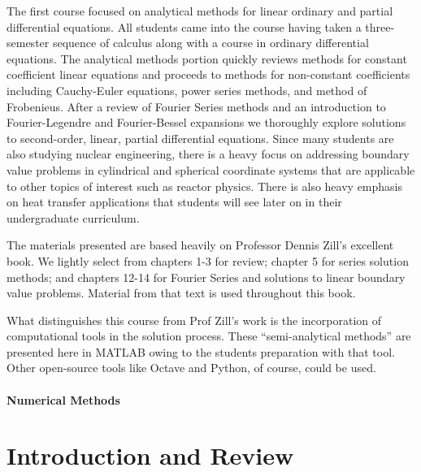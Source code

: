 \documentclass{tufte-book}
\theoremstyle{break}
\begin{document}
The first course focused on analytical methods for linear ordinary and partial differential equations.  All students came into the course having taken a three-semester sequence of calculus along with a course in ordinary differential equations.  The analytical methods portion quickly reviews methods for constant coefficient linear equations and proceeds to methods for non-constant coefficients including Cauchy-Euler equations, power series methods, and method of Frobenieus.  After a review of Fourier Series methods and an introduction to Fourier-Legendre and Fourier-Bessel expansions we thoroughly explore solutions to second-order, linear, partial differential equations.  Since many students are also studying nuclear engineering, there is a heavy focus on addressing boundary value problems in cylindrical and spherical coordinate systems that are applicable to other topics of interest such as reactor physics.  There is also heavy emphasis on heat transfer applications that students will see later on in their undergraduate curriculum.

The materials presented are based heavily on Professor Dennis Zill's excellent book.\cite[-3cm]{zill2020advanced} We lightly select from chapters 1-3 for review; chapter 5 for series solution methods; and chapters 12-14 for Fourier Series and solutions to linear boundary value problems.  Material from that text is used throughout this book.  

What distinguishes this course from Prof Zill's work is the incorporation of computational tools in the solution process.  These ``semi-analytical methods'' are presented here in MATLAB\cite[-3.75cm]{matlab} owing to the students preparation with that tool.  Other open-source tools like Octave\cite[-3.5cm]{octave} and Python,\cite[-1cm]{10.5555/1593511} of course, could be used. 

\subsection*{Numerical Methods}

\mainmatter

\part{Introduction and Review}









\end{document}
